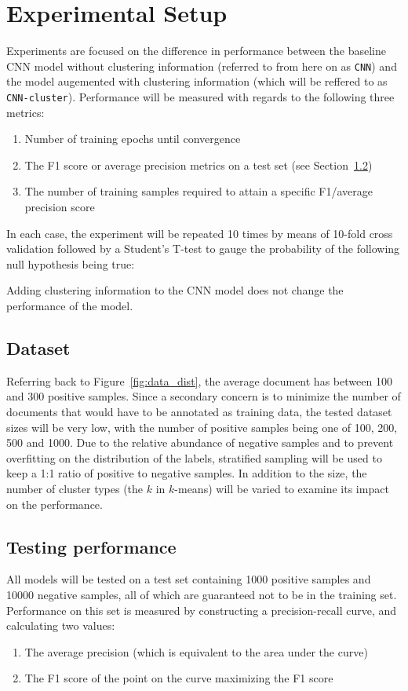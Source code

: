 \section{Experimental Setup}
Experiments are focused on the difference in performance between the baseline
CNN model without clustering information (referred to from here on as
\texttt{CNN}) and the model augemented with clustering information (which will
be reffered to as \texttt{CNN-cluster}). Performance will be measured with
regards to the following three metrics:
\begin{enumerate}
\item Number of training epochs until convergence
\item The F1 score or average precision metrics on a test set (see
  Section~\ref{sec:metrics})
\item The number of training samples required to attain a specific F1/average
  precision score
\end{enumerate}

In each case, the experiment will be repeated 10 times by means of 10-fold cross
validation followed by a Student's T-test to gauge the probability of the
following null hypothesis being true:
\begin{nullhypothesis}
  Adding clustering information to the CNN model does not change the
  performance of the model.
\end{nullhypothesis}

\subsection{Dataset}
Referring back to Figure~\ref{fig:data_dist}, the average document has between
100 and 300 positive samples. Since a secondary concern is to minimize the
number of documents that would have to be annotated as training data, the tested
dataset sizes will be very low, with the number of positive samples being one of
100, 200, 500 and 1000. Due to the relative abundance of negative samples and to
prevent overfitting on the distribution of the labels, stratified sampling will
be used to keep a 1:1 ratio of positive to negative samples. In addition to the
size, the number of cluster types (the $k$ in $k$-means) will be varied to
examine its impact on the performance.

\subsection{Testing performance}
\label{sec:metrics}
All models will be tested on a test set containing 1000 positive samples and
10000 negative samples, all of which are guaranteed not to be in the training
set. Performance on this set is measured by constructing a precision-recall
curve, and calculating two values:
\begin{enumerate}
\item The average precision (which is equivalent to the area under the curve)
\item The F1 score of the point on the curve maximizing the F1 score
\end{enumerate}

